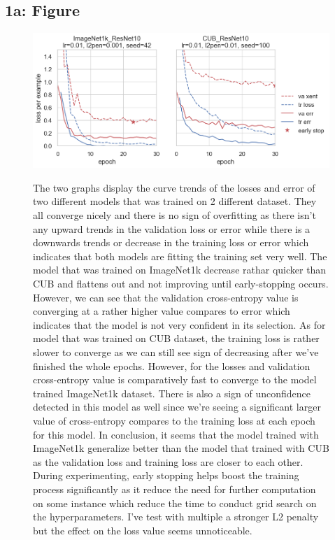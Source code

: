 \documentclass[10pt]{article}
\begin{document}
\subsection{1a: Figure}
\renewcommand{\figurename}{Fig.}
\renewcommand{\thefigure}{1a}
 \begin{figure}[!h]
     \centering
     \includegraphics[height=.4\textwidth]{./Figure 1A.png}
     \label{fig:1a}
\caption{
  The two graphs display the curve trends of the losses and error of two
  different models that was trained on 2 different dataset. They all converge
  nicely and there is no sign of overfitting as there isn't any upward trends in
  the validation loss or error while there is a downwards trends or decrease in
  the training loss or error which indicates that both models are fitting the
  training set very well. The model that was trained on ImageNet1k decrease
  rathar quicker than CUB and flattens out and not improving until
  early-stopping occurs. However, we can see that the
  validation cross-entropy value is converging at a rather higher value compares
  to error which indicates that the model is not very confident in its
  selection. As for model that was trained on CUB dataset, the training loss is
  rather slower to converge as we can still see sign of decreasing after we've
  finished the whole epochs. However, for the losses and validation
  cross-entropy value is comparatively fast to converge to the model trained ImageNet1k
  dataset. There is also a sign of unconfidence detected in this model as well
  since we're seeing a significant larger value of cross-entropy compares to the
  training loss at each epoch for this model. In conclusion, it seems that the
  model trained with ImageNet1k generalize better than the model that trained
  with CUB as the validation loss and training loss are closer to each other.
  During experimenting, early stopping helps boost the training process
  significantly as it reduce the need for further computation on some instance
  which reduce the time to conduct grid search on the hyperparameters. I've
  test with multiple a stronger L2 penalty but the effect on the loss value
  seems unnoticeable.
}%
 \end{figure}
\end{document}
